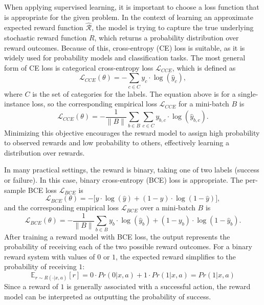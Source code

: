 \documentclass[./dissertation.tex]{subfiles}
\begin{document}
When applying supervised learning, it is important to choose a loss function that is appropriate for the given problem. In the context of learning an approximate expected reward function $\hat{\mathcal{R}}$, the model is trying to capture the true underlying stochastic reward function $R$, which returns a probability distribution over reward outcomes. Because of this, cross-entropy (CE) loss \parencite{BCELoss} is suitable, as it is widely used for probability models and classification tasks. The most general form of CE loss is categorical cross-entropy loss $\mathcal{L}_{CCE}$, which is defined as
\begin{equation}
\mathcal{L}_{CCE}(\theta) =
-\sum_{c \in C}
y_{c}\cdot \log(\hat y_{c}),
\end{equation}
where $C$ is the set of categories for the labels. The equation above is for a single-instance loss, so the corresponding empirical loss $\mathscr{L}_{CCE}$ for a mini-batch $B$ is
\begin{equation}
\mathscr{L}_{CCE}(\theta) =
-\frac{1}{\|B\|}\sum_{b \in B}\sum_{c \in C}
y_{b,c}\cdot \log(\hat y_{b,c}).
\end{equation}
Minimizing this objective encourages the reward model to assign high probability to observed rewards and low probability to others, effectively learning a distribution over rewards.

In many practical settings, the reward is binary, taking one of two labels (success or failure). In this case, binary cross-entropy (BCE) loss is appropriate. The per-sample BCE loss $\mathcal{L}_{BCE}$ is
\begin{equation}
\mathcal{L}_{BCE}(\theta) =
- \big[ y\cdot \log(\hat y) + 
(1-y) \cdot \log(1-\hat y) \big],
\end{equation}
and the corresponding empirical loss $\mathscr{L}_{BCE}$ over a mini-batch $B$ is
\begin{equation}
\mathscr{L}_{BCE}(\theta) =
-\frac{1}{\|B\|}\sum_{b \in B}
y_b\cdot \log(\hat y_b) + 
(1-y_b) \cdot \log(1-\hat y_b).
\end{equation}
After training a reward model with BCE loss, the output represents the probability of receiving each of the two possible reward outcomes. For a binary reward system with values of $0$ or $1$, the expected reward simplifies to the probability of receiving $1$:
\[
\mathbb{E}_{r \sim R(\cdot|x,a)}[r] = 0\cdot Pr(0|x,a) + 1\cdot Pr(1|x,a) = Pr(1|x,a)
\]
Since a reward of $1$ is generally associated with a successful action, the reward model can be interpreted as outputting the probability of success.
\end{document}
